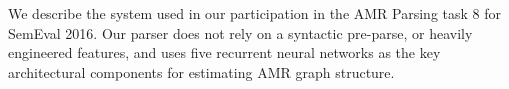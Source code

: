 We describe the system used in our participation in the AMR Parsing task 8 for SemEval 2016. Our parser does not rely on a syntactic pre-parse, or heavily engineered features, and uses five recurrent neural networks as the key architectural components for estimating AMR graph structure.
